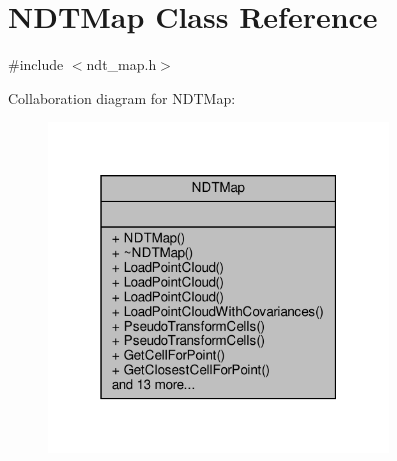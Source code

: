 \hypertarget{classNDTMap}{}\section{N\+D\+T\+Map Class Reference}
\label{classNDTMap}


{\ttfamily \#include $<$ndt\+\_\+map.\+h$>$}



Collaboration diagram for N\+D\+T\+Map\+:\nopagebreak
\begin{figure}[H]
\begin{center}
\leavevmode
\includegraphics[width=256pt]{d0/d07/classNDTMap__coll__graph}
\end{center}
\end{figure}
